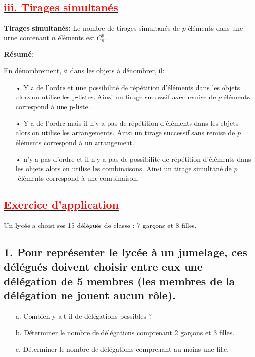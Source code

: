 \documentclass[12pt]{article}
\begin{document}
\subsection*{\underline{\textbf{\textcolor{red}{iii. Tirages simultanés}}}}
\textbf{Tirages simultanés:} Le nombre de tirages simultanés de $p$ éléments dans une urne contenant $n$ éléments est $C_{n}^{p}$.

\textbf{Résumé:}

En dénombrement, si dans les objets à dénombrer, il:
\begin{itemize}
    \item[•] Y a de l’ordre et une possibilité de répétition d’éléments dans les objets alors on utilise les p-listes. Ainsi un tirage successif avec remise de $p$ éléments correspond à une p-liste.
    \item[•] Y a de l’ordre mais il n’y a pas de répétition d’éléments dans les objets alors on utilise les arrangements. Ainsi un tirage successif sans remise de $p$ éléments correspond à un arrangement.
    \item[•] n’y a pas d’ordre et il n’y a pas de possibilité de répétition d’éléments dans les objets alors on utilise les combinaisons. Ainsi un tirage simultané de $p$-éléments correspond à une combinaison.
\end{itemize}
\subsection*{\underline{\textbf{\textcolor{red}{Exercice d’application}}}}
Un lycée a choisi ses 15 délégués de classe : 7 garçons et 8 filles.

\subsection*{1. Pour représenter le lycée à un jumelage, ces délégués doivent choisir entre eux une délégation de 5 membres (les membres de la délégation ne jouent aucun rôle).}
\begin{enumerate}
    \item[a.] Combien y a-t-il de délégations possibles ? \\
    
    \item[b.] Déterminer le nombre de délégations comprenant 2 garçons et 3 filles. \\
    
    \item[c.] Déterminer le nombre de délégations comprenant au moins une fille. \\
\end{enumerate}
\end{document}
